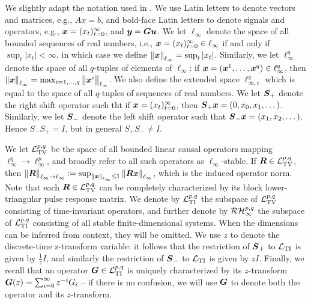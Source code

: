 We slightly adapt the notation used in \cite{khammash1990stability}.  We use Latin letters to denote vectors and matrices, e.g., $Ax = b$, and bold-face Latin letters to denote signals and operators, e.g., $\boldsymbol{x} = (x_t)_{t=0}^\infty$, and $\boldsymbol{y} = \boldsymbol{G} \boldsymbol{u}$.  We let $\ell_\infty$ denote the space of all bounded sequences of real numbers, i.e., $\boldsymbol{x} = (x_t)_{t=0}^\infty \in \ell_\infty$ if and only if $\sup_t |x_t|<\infty$, in which case we define $\left\|\boldsymbol{x}\right\|_{\ell_\infty} = \sup_t |x_t|$.  Similarly, we let $\ell^q_\infty$ denote the space of all $q$-tuples of elements of $\ell_\infty$: if $\boldsymbol{x} = (\boldsymbol{x}^1, \dots, \boldsymbol{x}^q) \in \ell^q_\infty$, then $\left\|\boldsymbol{x}\right\|_{\ell_\infty} = \max_{i=1,\dots, q}\left\|\boldsymbol{x}^i\right\|_{\ell_\infty}$.  We also define the extended space $\ell^{q}_{\infty,e}$ which is equal to the space of all $q$-tuples of sequences of real numbers.  We let $\boldsymbol{S}_+$ denote the right shift operator such tht if $\boldsymbol{x} = (x_t)_{t=0}^\infty$, then $\boldsymbol{S}_+\boldsymbol{x} = (0,x_0, x_1, \dots)$.  Similarly, we let $\boldsymbol{S}_-$ denote the left shift operator such that $\boldsymbol{S}_- \boldsymbol{x} = (x_1,x_2, \dots)$.  Hence $S_-S_+ = I$, but in general $S_+ S_- \neq I$.  

We let $\mathcal{L}_{\mathrm{TV}}^{p,q}$ be the space of all bounded linear causal operators mapping $\ell^q_\infty \to \ell^p_\infty$, and broadly refer to all such operators as $\ell_\infty$-stable.  If $\boldsymbol{R} \in \mathcal{L}_{\mathrm{TV}}^{p,q}$, then $\left\|\boldsymbol{R}\right\|_{\ell_\infty\to\ell_\infty} := \sup_{\left\|\boldsymbol{x}\right\|_{\ell_\infty}\leq 1}\left\|\boldsymbol{R} \boldsymbol{x}\right\|_{\ell_\infty}$, which is the induced operator norm.  Note that each $\boldsymbol{R} \in \mathcal{L}_{\mathrm{TV}}^{p,q}$ can be completely characterized by its block lower-triangular pulse response matrix.  We denote by $\mathcal{L}_{\mathrm{TI}}^{p,q}$ the subspace of $\mathcal{L}_{\mathrm{TV}}^{p,q}$ consisting of time-invariant operators, and further denote by $\mathcal{RH}_\infty^{p,q}$ the subspace of $\mathcal{L}_{\mathrm{TI}}^{p,q}$ consisting of all stable finite-dimensional systems.  When the dimensions can be inferred from context, they will be omitted.  We use $z$ to denote the discrete-time z-transform variable: it follows that the restriction of $\boldsymbol{S}_+$ to $\mathcal{L}_{\mathrm{TI}}$ is given by $\frac{1}{z}I$, and similarly the restriction of $\boldsymbol{S}_-$ to $\mathcal{L}_{\mathrm{TI}}$ is given by $zI$.  Finally, we recall that an operator $\boldsymbol{G} \in \mathcal{L}_{\mathrm{TI}}^{p,q}$ is uniquely characterized by its $z$-transform $\boldsymbol{G}(z) = \sum_{i=0}^\infty z^{-i}G_i$ -- if there is no confusion, we will use $\boldsymbol{G}$ to denote both the operator and its $z$-transform.

